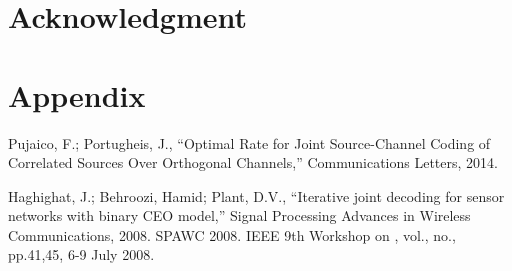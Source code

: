 \documentclass[journal]{IEEEtran}
\begin{document}
\section*{Acknowledgment}

\section{Appendix} \label{sec:Appendix}

\begin{thebibliography}{99}

 Pujaico, F.; Portugheis, J.,
``Optimal Rate for Joint Source-Channel Coding of Correlated Sources Over 
Orthogonal Channels,'' Communications Letters, 2014.

 Haghighat, J.; Behroozi, Hamid; Plant, D.V., 
``Iterative joint decoding for sensor networks with binary CEO model,'' 
Signal Processing Advances in Wireless Communications, 2008. SPAWC 2008. 
IEEE 9th Workshop on , vol., no., pp.41,45, 6-9 July 2008.

\end{thebibliography}
\end{document}
